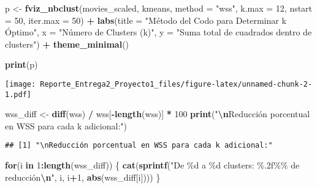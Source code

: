 \documentclass[
]{article}
\newenvironment{Shaded}{\begin{snugshade}}{\end{snugshade}}
\newcommand{\AttributeTok}[1]{\textcolor[rgb]{0.13,0.29,0.53}{#1}}
\newcommand{\ControlFlowTok}[1]{\textcolor[rgb]{0.13,0.29,0.53}{\textbf{#1}}}
\newcommand{\DecValTok}[1]{\textcolor[rgb]{0.00,0.00,0.81}{#1}}
\newcommand{\FunctionTok}[1]{\textcolor[rgb]{0.13,0.29,0.53}{\textbf{#1}}}
\newcommand{\NormalTok}[1]{#1}
\newcommand{\OtherTok}[1]{\textcolor[rgb]{0.56,0.35,0.01}{#1}}
\newcommand{\SpecialCharTok}[1]{\textcolor[rgb]{0.81,0.36,0.00}{\textbf{#1}}}
\newcommand{\StringTok}[1]{\textcolor[rgb]{0.31,0.60,0.02}{#1}}
\begin{document}
\begin{Shaded}
\begin{Highlighting}[]
\NormalTok{p }\OtherTok{\textless{}{-}} \FunctionTok{fviz\_nbclust}\NormalTok{(movies\_scaled, }
\NormalTok{             kmeans, }
             \AttributeTok{method =} \StringTok{"wss"}\NormalTok{,}
             \AttributeTok{k.max =} \DecValTok{12}\NormalTok{,  }
             \AttributeTok{nstart =} \DecValTok{50}\NormalTok{,  }
             \AttributeTok{iter.max =} \DecValTok{50}\NormalTok{) }\SpecialCharTok{+}  
  \FunctionTok{labs}\NormalTok{(}\AttributeTok{title =} \StringTok{"Método del Codo para Determinar k Óptimo"}\NormalTok{,}
       \AttributeTok{x =} \StringTok{"Número de Clusters (k)"}\NormalTok{,}
       \AttributeTok{y =} \StringTok{"Suma total de cuadrados dentro de clusters"}\NormalTok{) }\SpecialCharTok{+}
  \FunctionTok{theme\_minimal}\NormalTok{()}

\FunctionTok{print}\NormalTok{(p)}
\end{Highlighting}
\end{Shaded}

\texttt{[image: Reporte\_Entrega2\_Proyecto1\_files/figure-latex/unnamed-chunk-2-1.pdf]}

\begin{Shaded}
\begin{Highlighting}[]
\NormalTok{wss\_diff }\OtherTok{\textless{}{-}} \FunctionTok{diff}\NormalTok{(wss) }\SpecialCharTok{/}\NormalTok{ wss[}\SpecialCharTok{{-}}\FunctionTok{length}\NormalTok{(wss)] }\SpecialCharTok{*} \DecValTok{100}
\FunctionTok{print}\NormalTok{(}\StringTok{"}\SpecialCharTok{\textbackslash{}n}\StringTok{Reducción porcentual en WSS para cada k adicional:"}\NormalTok{)}
\end{Highlighting}
\end{Shaded}

\begin{verbatim}
## [1] "\nReducción porcentual en WSS para cada k adicional:"
\end{verbatim}

\begin{Shaded}
\begin{Highlighting}[]
\ControlFlowTok{for}\NormalTok{(i }\ControlFlowTok{in} \DecValTok{1}\SpecialCharTok{:}\FunctionTok{length}\NormalTok{(wss\_diff)) \{}
  \FunctionTok{cat}\NormalTok{(}\FunctionTok{sprintf}\NormalTok{(}\StringTok{"De \%d a \%d clusters: \%.2f\%\% de reducción}\SpecialCharTok{\textbackslash{}n}\StringTok{"}\NormalTok{, }
\NormalTok{              i, i}\SpecialCharTok{+}\DecValTok{1}\NormalTok{, }\FunctionTok{abs}\NormalTok{(wss\_diff[i])))}
\NormalTok{\}}
\end{Highlighting}
\end{Shaded}
\end{document}
